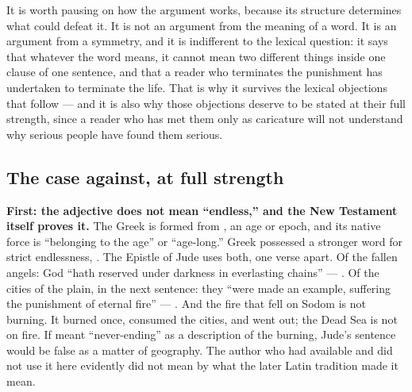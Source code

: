 It is worth pausing on how the argument works, because its structure determines what could defeat it. It is not an argument from the meaning of a word. It is an argument from a symmetry, and it is indifferent to the lexical question: it says that whatever the word means, it cannot mean two different things inside one clause of one sentence, and that a reader who terminates the punishment has undertaken to terminate the life. That is why it survives the lexical objections that follow --- and it is also why those objections deserve to be stated at their full strength, since a reader who has met them only as caricature will not understand why serious people have found them serious.

\subsection{The case against, at full strength}

\textbf{First: the adjective does not mean ``endless,'' and the New Testament itself proves it.} The Greek  is formed from , an age or epoch, and its native force is ``belonging to the age'' or ``age-long.'' Greek possessed a stronger word for strict endlessness, . The Epistle of Jude uses both, one verse apart. Of the fallen angels: God ``hath reserved under darkness in everlasting chains'' --- . Of the cities of the plain, in the next sentence: they ``were made an example, suffering the punishment of eternal fire'' --- . And the fire that fell on Sodom is not burning. It burned once, consumed the cities, and went out; the Dead Sea is not on fire. If  meant ``never-ending'' as a description of the burning, Jude's sentence would be false as a matter of geography. The author who had  available and did not use it here evidently did not mean by  what the later Latin tradition made it mean.

